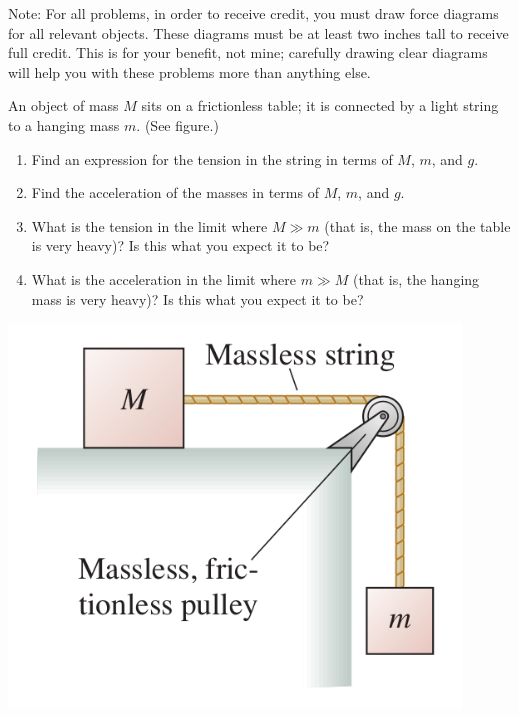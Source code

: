 \documentclass[12pt]{article}
\begin{document}
\Large
\centerline{}
\normalsize
\centerline{}

{\sc Note:} For all problems, in order to receive credit, you must draw force diagrams for all relevant objects. These diagrams must be at least two inches tall to receive full credit.
This is for your benefit, not mine; carefully drawing clear diagrams will help you with these problems more than anything else.

\begin{enumerate}


  \begin{minipage}{0.7\textwidth}
\item  An object of mass $M$ sits on a frictionless table; it is connected by
   a light string to a hanging mass $m$. (See figure.)
\begin{enumerate}
\item Find an expression for the tension in the string in terms of $M$, $m$, and $g$.
\item Find the acceleration of the masses in terms of $M$, $m$, and $g$.
\item What is the tension in the limit where $M \gg m$ (that is, the mass on the table is very heavy)? Is this what you expect it to be?
\item What is the acceleration in the limit where $m \gg M$ (that is, the hanging mass is very heavy)? Is this what you expect it to be?
\end{enumerate}
  \end{minipage}
  \begin{minipage}{0.3\textwidth}
\centerline{\includegraphics[width=0.9\textwidth]{problem736.png}}
  \end{minipage}


\end{enumerate}
\end{document}
